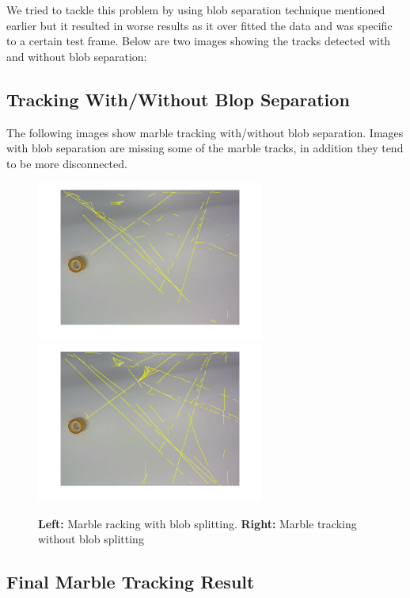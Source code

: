 \documentclass[10pt,a4paper,onecolumn]{report}
\begin{document}
We tried to tackle this problem by using blob separation technique mentioned earlier but it resulted in worse results as it over fitted the data and was specific to a certain test frame. Below are two images showing the tracks detected with and without blob separation:

\subsection{Tracking With/Without Blop Separation}

The following images show marble tracking with/without blob separation. Images with blob separation are missing some of the marble tracks, in addition they tend to be more disconnected.

\begin{center}
	\begin{figure}[h!]
		\includegraphics[width=7.5cm]{blob_splitting_track_with2.png}
		\includegraphics[width=7.5cm]{blob_splitting_track_without2.png}
		\caption{\textbf{Left:} Marble racking with blob splitting.  \textbf{Right:} Marble tracking without blob splitting}
	\end{figure}
\end{center}

\subsection{Final Marble Tracking Result}
\end{document}
